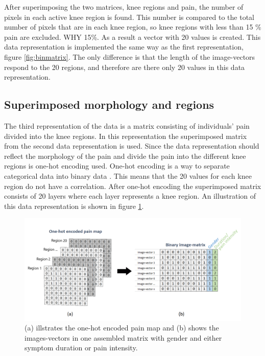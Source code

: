 \noindent
After superimposing the two matrices, knee regions and pain, the number of pixels in each active knee region is found. This number is compared to the total number of pixels that are in each knee region, so knee regions with less than 15 \% pain are excluded. WHY 15\%. As a result a vector with 20 values is created. This data representation is implemented the same way as the first representation, figure \ref{fig:binmatrix}. The only difference is that the length of the image-vectors respond to the 20 regions, and therefore are there only 20 values in this data representation.


\subsection{Superimposed morphology and regions}
The third representation of the data is a matrix consisting of individuals’ pain divided into the knee regions.
\noindent
In this representation the superimposed matrix from the second data representation is used. Since the data representation should reflect the morphology of the pain and divide the pain into the different knee regions is one-hot encoding used. One-hot encoding is a way to separate categorical data into binary data \citep{Harris2012}. This means that the 20 values for each knee region do not have a correlation. After one-hot encoding the superimposed matrix consists of 20 layers where each layer represents a knee region. An illustration of this data representation is shown in figure \ref{fig:onehot}.


\begin{figure} [H]
\centering
\includegraphics[width=1\textwidth]{figures/onehotmatrix}
\caption{(a) illstrates the one-hot encoded pain map and (b) shows the images-vectors in one assembled matrix with gender and either symptom duration or pain intensity.}
\label{fig:onehot}
\end{figure}